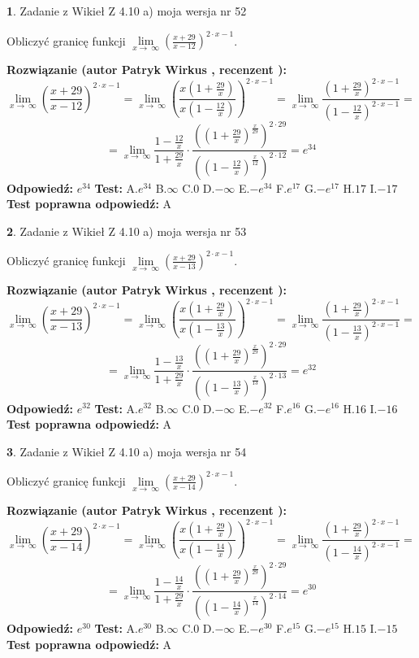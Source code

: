 \documentclass[12pt, a4paper]{article}
\theoremstyle{definition} %
\newtheorem{zad}{}
\newcommand{\zadStart}[1]{\begin{zad}#1\newline}
\newcommand{\zadStop}{\end{zad}}
\newcommand{\rozwStart}[2]{\noindent \textbf{Rozwiązanie (autor #1 , recenzent #2): }\newline}
\newcommand{\rozwStop}{\newline}
\newcommand{\odpStart}{\noindent \textbf{Odpowiedź:}\newline}
\newcommand{\odpStop}{\newline}
\newcommand{\testStart}{\noindent \textbf{Test:}\newline}
\newcommand{\testStop}{\newline}
\newcommand{\kluczStart}{\noindent \textbf{Test poprawna odpowiedź:}\newline}
\newcommand{\kluczStop}{\newline}
\begin{document}
\zadStart{Zadanie z Wikieł Z 4.10 a) moja wersja nr 52}

Obliczyć granicę funkcji  $\lim\limits_{x\to\ \infty}(\frac{x+29}{x-12})^{2\cdot x-1}$.
\zadStop
\rozwStart{Patryk Wirkus}{}
$$\lim\limits_{x\to\ \infty}(\frac{x+29}{x-12})^{2\cdot x-1} = \lim\limits_{x\to\ \infty}(\frac{x(1+\frac{29}{x})}{x(1-\frac{12}{x})})^{2\cdot x-1}=\lim\limits_{x\to\ \infty}\frac{(1+\frac{29}{x})^{2\cdot x-1}}{(1-\frac{12}{x})^{2\cdot x-1}}=$$
$$=\lim\limits_{x\to\ \infty}\frac{1-\frac{12}{x}}{1+\frac{29}{x}}\cdot\frac{((1+\frac{29}{x})^{\frac{x}{29}})^{2\cdot29}}{((1-\frac{12}{x})^{\frac{x}{12}})^{2\cdot12}}=e^{34}$$
\rozwStop
\odpStart
$e^{34}$
\odpStop
\testStart
A.$e^{34}$ B.$\infty$ C.$0$ D.$-\infty$ E.$-e^{34}$
F.$e^{17}$ G.$-e^{17}$
H.$17$
I.$-17$
\testStop
\kluczStart
A
\kluczStop



\zadStart{Zadanie z Wikieł Z 4.10 a) moja wersja nr 53}

Obliczyć granicę funkcji  $\lim\limits_{x\to\ \infty}(\frac{x+29}{x-13})^{2\cdot x-1}$.
\zadStop
\rozwStart{Patryk Wirkus}{}
$$\lim\limits_{x\to\ \infty}(\frac{x+29}{x-13})^{2\cdot x-1} = \lim\limits_{x\to\ \infty}(\frac{x(1+\frac{29}{x})}{x(1-\frac{13}{x})})^{2\cdot x-1}=\lim\limits_{x\to\ \infty}\frac{(1+\frac{29}{x})^{2\cdot x-1}}{(1-\frac{13}{x})^{2\cdot x-1}}=$$
$$=\lim\limits_{x\to\ \infty}\frac{1-\frac{13}{x}}{1+\frac{29}{x}}\cdot\frac{((1+\frac{29}{x})^{\frac{x}{29}})^{2\cdot29}}{((1-\frac{13}{x})^{\frac{x}{13}})^{2\cdot13}}=e^{32}$$
\rozwStop
\odpStart
$e^{32}$
\odpStop
\testStart
A.$e^{32}$ B.$\infty$ C.$0$ D.$-\infty$ E.$-e^{32}$
F.$e^{16}$ G.$-e^{16}$
H.$16$
I.$-16$
\testStop
\kluczStart
A
\kluczStop



\zadStart{Zadanie z Wikieł Z 4.10 a) moja wersja nr 54}

Obliczyć granicę funkcji  $\lim\limits_{x\to\ \infty}(\frac{x+29}{x-14})^{2\cdot x-1}$.
\zadStop
\rozwStart{Patryk Wirkus}{}
$$\lim\limits_{x\to\ \infty}(\frac{x+29}{x-14})^{2\cdot x-1} = \lim\limits_{x\to\ \infty}(\frac{x(1+\frac{29}{x})}{x(1-\frac{14}{x})})^{2\cdot x-1}=\lim\limits_{x\to\ \infty}\frac{(1+\frac{29}{x})^{2\cdot x-1}}{(1-\frac{14}{x})^{2\cdot x-1}}=$$
$$=\lim\limits_{x\to\ \infty}\frac{1-\frac{14}{x}}{1+\frac{29}{x}}\cdot\frac{((1+\frac{29}{x})^{\frac{x}{29}})^{2\cdot29}}{((1-\frac{14}{x})^{\frac{x}{14}})^{2\cdot14}}=e^{30}$$
\rozwStop
\odpStart
$e^{30}$
\odpStop
\testStart
A.$e^{30}$ B.$\infty$ C.$0$ D.$-\infty$ E.$-e^{30}$
F.$e^{15}$ G.$-e^{15}$
H.$15$
I.$-15$
\testStop
\kluczStart
A
\kluczStop
\end{document}

